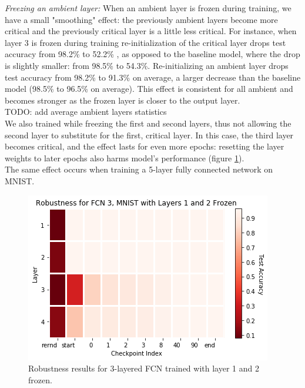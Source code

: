\documentclass{article}
\begin{document}
\emph{Freezing an ambient layer:} When  an ambient layer is frozen during training, we have a small "smoothing" effect: the previously ambient layers become more critical and the previously critical layer is a little less critical. For instance, when layer 3 is frozen during training re-initialization of the critical layer drops test accuracy from 98.2\% to 52.2\% , as opposed to the baseline model, where the drop is slightly smaller: from 98.5\% to 54.3\%. Re-initializing an ambient layer drops test accuracy from 98.2\% to 91.3\% on average, a larger decrease than the baseline model (98.5\% to 96.5\% on average). This effect is consistent for all ambient and becomes stronger as the frozen layer is closer to the output layer.\\    TODO: add average ambient layers statistics\\
We also trained while freezing the first and second layers, thus not allowing the second layer to substitute for the first, critical layer. In this case, the third layer becomes critical, and the effect lasts for even more epochs: resetting the layer weights to later epochs also harms model's performance (figure \ref{fig:f12_fc3_heatmap}).\\
The same effect occurs when training a 5-layer fully connected network on MNIST. \\
\begin{figure}
  \includegraphics[width=\linewidth]{images/f12_fc3_mnist_heatmap.png}
  \caption{Robustness results for 3-layered FCN trained with layer 1 and 2 frozen.}
  \label{fig:f12_fc3_heatmap}
\end{figure}
\end{document}
